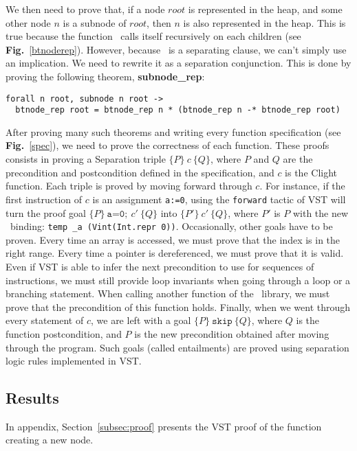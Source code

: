 We then need to prove that, if a node $root$ is represented in the heap, and some other node $n$ is a subnode of $root$, then $n$ is also represented in the heap.
This is true because the function \btrep\ calls itself recursively on each children (see \textbf{Fig.}~\ref{btnoderep}).
However, because \btrep\ is a separating clause, we can't simply use an implication. We need to rewrite it as a separation conjunction.
This is done by proving the following theorem, \textbf{subnode\_rep}:

\begin{lstlisting}[language=Coq]
  forall n root, subnode n root ->
  btnode_rep root = btnode_rep n * (btnode_rep n -* btnode_rep root)
\end{lstlisting}


After proving many such theorems and writing every function specification (see \textbf{Fig.}~\ref{spec}), we need to prove the correctness of each function.
These proofs consists in proving a Separation triple $\{P\}~c~\{Q\}$, where $P$ and $Q$ are the precondition and postcondition defined in the specification, and $c$ is the Clight function.
Each triple is proved by moving forward through $c$.
For instance, if the first instruction of $c$ is an assignment \texttt{a:=0}, using the \lstinline[language=Coq]{forward} tactic of VST will turn the proof goal $\{P\}~\texttt{a=0};~c'~\{Q\}$ into $\{P'\}~c'~\{Q\}$,
where $P'$ is $P$ with the new \local\ binding: \texttt{temp \_a (Vint(Int.repr 0))}.
Occasionally, other goals have to be proven.
Every time an array is accessed, we must prove that the index is in the right range.
Every time a pointer is dereferenced, we must prove that it is valid.
Even if VST is able to infer the next precondition to use for sequences of instructions, we must still provide loop invariants when going through a loop or a branching statement.
When calling another function of the \btrees\ library, we must prove that the precondition of this function holds.
Finally, when we went through every statement of $c$, we are left with a goal $\{P\}~\texttt{skip}~\{Q\}$, where $Q$ is the function postcondition, and $P$ is the new precondition obtained after moving through the program.
Such goals (called entailments) are proved using separation logic rules implemented in VST.

\subsection{Results}
In appendix, Section~\ref{subsec:proof} presents the VST proof of the function creating a new node.
